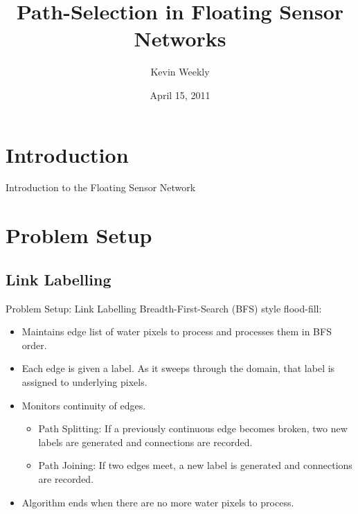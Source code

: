\documentclass[xcolor=pdflatex,dvipsnames,table]{beamer}
\title{Path-Selection in Floating Sensor Networks}
\author[K. Weekly]{Kevin Weekly}
\institute[UCB]{
  Dept. of Electrical Engineering and Computer Sciences\\
  University of California, Berkeley \\
}
\date{April 15, 2011}
\begin{document}
\begin{frame}[plain]
  \titlepage
\end{frame}

\section{Introduction}
\begin{frame}{Introduction to the Floating Sensor Network}
 

\end{frame}


\AtBeginSection[]
{
   \begin{frame}
       \tableofcontents[currentsection]
   \end{frame}
}

\section{Problem Setup}
\subsection{Link Labelling}
\begin{frame}{Problem Setup: Link Labelling}
Breadth-First-Search (BFS) style flood-fill:
\begin{itemize}
   \item Maintains edge list of water pixels to process and processes them in BFS order.
   \item Each edge is given a label. As it sweeps through the domain, that label is assigned to underlying pixels.
   \item Monitors continuity of edges.
\begin{itemize}
    \item Path Splitting: If a previously continuous edge becomes broken, two new labels are generated and connections are recorded. 
    \item Path Joining: If two edges meet, a new label is generated and connections are recorded.
\end{itemize}
   \item Algorithm ends when there are no more water pixels to process.
\end{itemize}
\end{frame}
\end{document}
